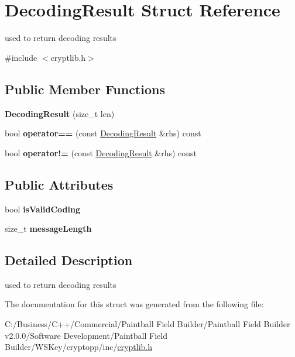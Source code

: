 \hypertarget{struct_decoding_result}{
\section{DecodingResult Struct Reference}
\label{struct_decoding_result}
}


used to return decoding results  


{\ttfamily \#include $<$cryptlib.h$>$}\subsection*{Public Member Functions}
\begin{DoxyCompactItemize}
\item 
\hypertarget{struct_decoding_result_a04f03ea66845fe03fc464de05a816bbb}{
{\bfseries DecodingResult} (size\_\-t len)}
\label{struct_decoding_result_a04f03ea66845fe03fc464de05a816bbb}

\item 
\hypertarget{struct_decoding_result_a4ff48f3460b4a1a0238c08c97893867c}{
bool {\bfseries operator==} (const \hyperlink{struct_decoding_result}{DecodingResult} \&rhs) const }
\label{struct_decoding_result_a4ff48f3460b4a1a0238c08c97893867c}

\item 
\hypertarget{struct_decoding_result_a0d3e59dfd95799e1bd7adbcdd33aedeb}{
bool {\bfseries operator!=} (const \hyperlink{struct_decoding_result}{DecodingResult} \&rhs) const }
\label{struct_decoding_result_a0d3e59dfd95799e1bd7adbcdd33aedeb}

\end{DoxyCompactItemize}
\subsection*{Public Attributes}
\begin{DoxyCompactItemize}
\item 
\hypertarget{struct_decoding_result_ab88062318cd0e68b3061db351d3ba34d}{
bool {\bfseries isValidCoding}}
\label{struct_decoding_result_ab88062318cd0e68b3061db351d3ba34d}

\item 
\hypertarget{struct_decoding_result_af4496c82e5764175a27e36629e1cded7}{
size\_\-t {\bfseries messageLength}}
\label{struct_decoding_result_af4496c82e5764175a27e36629e1cded7}

\end{DoxyCompactItemize}


\subsection{Detailed Description}
used to return decoding results 

The documentation for this struct was generated from the following file:\begin{DoxyCompactItemize}
\item 
C:/Business/C++/Commercial/Paintball Field Builder/Paintball Field Builder v2.0.0/Software Development/Paintball Field Builder/WSKey/cryptopp/inc/\hyperlink{cryptlib_8h}{cryptlib.h}\end{DoxyCompactItemize}
